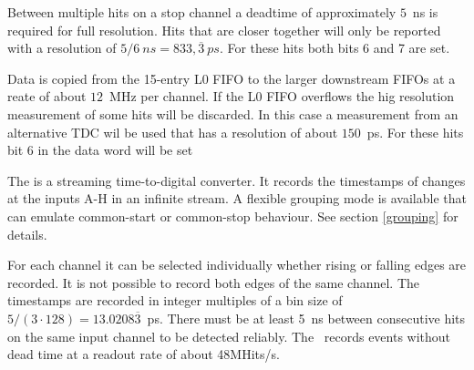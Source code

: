 {    Between multiple hits on a stop channel a deadtime of approximately $5$~ns is required for full resolution. 
    Hits that are closer together will only be reported with a resolution of $5/6~ns = 833,\overline{3}~ps$. For these hits both bits 6 and 7 are set.

    Data is copied from the 15-entry L0 FIFO to the larger downstream FIFOs at a reate of about $12$~MHz per channel. 
    If the L0 FIFO overflows the hig resolution measurement of some hits will be discarded. 
    In this case a measurement from an alternative TDC wil be used that has a resolution of about $150$~ps. 
    For these hits bit 6 in the data word will be set
} { %
    The \deviceName is a streaming time-to-digital converter. It records the timestamps of changes at the inputs A-H in an infinite stream. 
    A flexible grouping mode is available that can emulate common-start or common-stop behaviour. See section \ref{grouping} for details.

    For each channel it can be selected individually whether rising or falling edges are recorded. It is not possible to record both edges of the same channel. 
    The timestamps are recorded in integer multiples of a bin size of $5/(3\cdot 128) = 13.0208\overline{3}$~ps. 
    There must be at least 5~ns between consecutive hits on the same input channel to be detected reliably. 
    The \deviceName\ records events without dead time at a readout rate of about 48MHits/s.
}